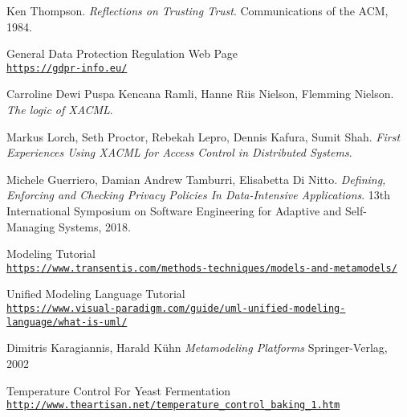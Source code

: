 \begin{thebibliography}{9}
Ken Thompson.
\textit{Reflections on Trusting Trust}. 
Communications of the ACM, 1984.

General Data Protection Regulation Web Page
\\\texttt{\url{https://gdpr-info.eu/}}

Carroline Dewi Puspa Kencana Ramli, Hanne Riis Nielson, Flemming Nielson.
\textit{The logic of XACML}.

Markus Lorch, Seth Proctor, Rebekah Lepro, Dennis Kafura, Sumit Shah.
\textit{First Experiences Using XACML for Access Control in Distributed Systems}.

Michele Guerriero, Damian Andrew Tamburri, Elisabetta Di Nitto.
\textit{Defining, Enforcing and Checking Privacy Policies In Data-Intensive Applications}. 
13th International Symposium on Software Engineering for Adaptive and Self-Managing Systems, 2018.

Modeling Tutorial
\\\texttt{\url{https://www.transentis.com/methods-techniques/models-and-metamodels/}}

Unified Modeling Language Tutorial
\\\texttt{\url{https://www.visual-paradigm.com/guide/uml-unified-modeling-language/what-is-uml/}}

Dimitris Karagiannis, Harald Kühn
\textit{Metamodeling Platforms}
Springer-Verlag, 2002

Temperature Control For Yeast Fermentation
\\\texttt{\url{http://www.theartisan.net/temperature\_control\_baking\_1.htm}}


\end{thebibliography}
